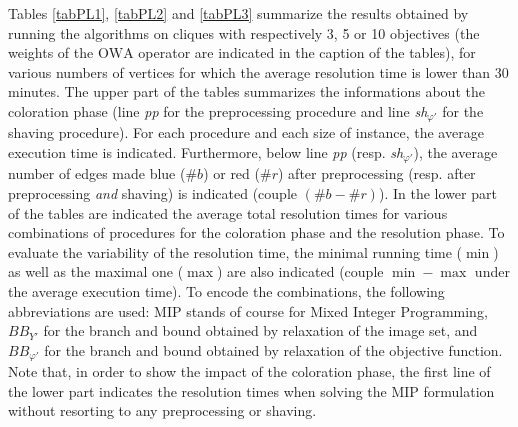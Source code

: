 \documentclass[final,3p,times]{elsarticle}
\newcommand{\owa}{\mbox{OWA}}
\begin{document}
Tables \ref{tabPL1}, \ref{tabPL2} and \ref{tabPL3} summarize the results
obtained by running the algorithms on cliques with respectively 3, 5
or 10 objectives (the weights of the $\owa$ operator are indicated in the caption of the tables), for various numbers of vertices for which the average resolution time is lower than 30 minutes. The upper part of the tables summarizes the informations
about the coloration phase (line \emph{pp} for the preprocessing
procedure and line \emph{sh$_{\varphi'}$} for the shaving procedure). For each procedure and each size of instance, the average execution time is indicated. Furthermore, below line \emph{pp} (resp. \emph{sh$_{\varphi'}$}), the average number of edges made blue ($\#b$) or red ($\#r$) after preprocessing (resp. after preprocessing \emph{and} shaving) is indicated (couple $(\#b-\#r)$). In the lower part of the tables are indicated the average total resolution times for various combinations of procedures for the coloration phase and the resolution phase. To evaluate the variability of the resolution time, the minimal running time ($\min$) as well as the maximal one ($\max$) are also indicated (couple $\min-\max$ under the average execution time). To encode the combinations, the following abbreviations are used: MIP stands of course for Mixed Integer Programming, $BB_{Y'}$  for the branch and bound obtained by relaxation of the image set, and $BB_{\varphi'}$ for the branch and bound obtained by relaxation of the objective function. Note that, in order to show the impact of the coloration phase, the first line of the lower part indicates the resolution times when solving the MIP formulation without resorting to any preprocessing or shaving. 
\end{document}
